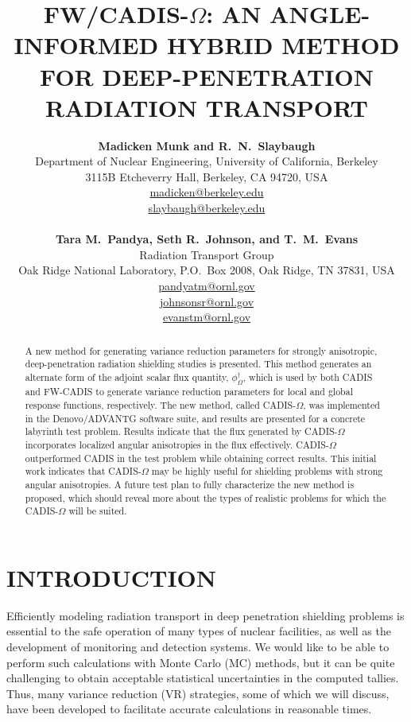\documentclass[12pt]{article}
\title{FW/CADIS-$\Omega$: AN ANGLE-INFORMED HYBRID METHOD FOR DEEP-PENETRATION RADIATION TRANSPORT}
\author{ 
  \textbf{Madicken Munk and R.~N.~Slaybaugh} \\
  Department of Nuclear Engineering, University of California, Berkeley \\
  3115B Etcheverry Hall, Berkeley, CA 94720, USA\\
  \href{mailto:madicken@berkeley.edu}{madicken@berkeley.edu}\\
  \href{mailto:slaybaugh@berkeley.edu}{slaybaugh@berkeley.edu}\\
  \\
  \textbf{Tara M.~Pandya, Seth R.~Johnson, and T.~M.~Evans}\\
  Radiation Transport Group\\
  Oak Ridge National Laboratory, P.O.\ Box 2008, Oak Ridge, TN 37831, USA\\
  \href{mailto:pandyatm@ornl.gov}{pandyatm@ornl.gov}\\
  \href{mailto:johnsonsr@ornl.gov}{johnsonsr@ornl.gov}\\
  \href{mailto:evanstm@ornl.gov}{evanstm@ornl.gov}
  }
\begin{document}


\maketitle

\begin{abstract}
A new method for generating variance reduction parameters for strongly anisotropic, deep-penetration radiation shielding studies is presented. This method generates an alternate form of the adjoint scalar flux quantity, $\phi^{\dagger}_{\Omega}$, which is used by both CADIS and FW-CADIS to generate variance reduction parameters for local and global response functions, respectively. The new method, called CADIS-$\Omega$, was implemented in the Denovo/ADVANTG software suite, and results are presented for a concrete labyrinth test problem. Results indicate that the flux generated by CADIS-$\Omega$ incorporates localized angular anisotropies in the flux effectively. CADIS-$\Omega$ outperformed CADIS in the test problem while obtaining correct results. This initial work indicates that CADIS-$\Omega$ may be highly useful for shielding problems with strong angular anisotropies. A future test plan to fully characterize the new method is proposed, which should reveal more about the types of realistic problems for which the CADIS-$\Omega$ will be suited. 
\end{abstract}


%
\section{INTRODUCTION}
\label{sect::intro}

Efficiently modeling radiation transport in deep penetration shielding problems is essential to the safe operation of many types of nuclear facilities, as well as the development of monitoring and detection systems. We would like to be able to perform such calculations with Monte Carlo (MC) methods, but it can be quite challenging to obtain acceptable statistical uncertainties in the computed tallies. Thus, many variance reduction (VR) strategies, some of which we will discuss, have been developed to facilitate accurate calculations in reasonable times. 
\end{document}
